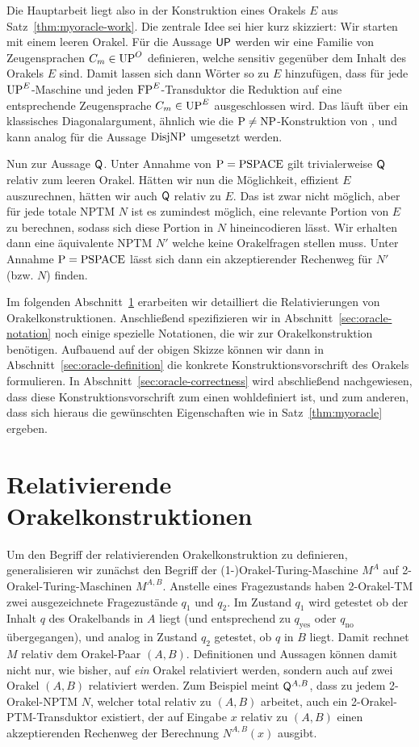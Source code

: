 Die Hauptarbeit liegt also in der Konstruktion eines Orakels $E$ aus Satz~\ref{thm:myoracle-work}.
Die zentrale Idee sei hier kurz skizziert:
Wir starten mit einem leeren Orakel.
Für die Aussage $\mathsf{UP}$ werden wir eine Familie von Zeugensprachen $C_m\in\mathrm{UP}^O$ definieren, welche sensitiv gegenüber dem Inhalt des Orakels $E$ sind.
Damit lassen sich dann Wörter so zu $E$ hinzufügen, dass für jede $\mathrm{UP}^E$-Maschine und jeden $\mathrm{FP}^E$-Transduktor die Reduktion auf eine entsprechende Zeugensprache $C_m\in\mathrm{UP}^E$ ausgeschlossen wird.
Das läuft über ein klassisches Diagonalargument, ähnlich wie die $\mathrm{P}\neq\mathrm{NP}$-Konstruktion von \textcite{baker_relativizations_1975}, und kann analog für die Aussage $\mathrm{DisjNP}$ umgesetzt werden.

Nun zur Aussage $\mathsf{Q}$. Unter Annahme von $\mathrm{P}=\mathrm{PSPACE}$ gilt trivialerweise $\mathsf{Q}$ relativ zum leeren Orakel. 
Hätten wir nun die Möglichkeit, effizient $E$ auszurechnen, hätten wir auch $\mathsf{Q}$ relativ zu $E$.
Das ist zwar nicht möglich, aber für jede totale NPTM $N$ ist es zumindest möglich, eine relevante Portion von $E$ zu berechnen, sodass sich diese Portion in $N$ hineincodieren lässt. Wir erhalten dann eine äquivalente NPTM $N'$ welche keine Orakelfragen stellen muss. Unter Annahme $\mathrm{P}=\mathrm{PSPACE}$ lässt sich dann ein akzeptierender Rechenweg für $N'$ (bzw. $N$) finden.


Im folgenden Abschnitt~\ref{sec:oracle-relativization} erarbeiten wir detailliert die Relativierungen von Orakelkonstruktionen.
Anschließend spezifizieren wir in Abschnitt~\ref{sec:oracle-notation} noch einige spezielle Notationen, die wir zur Orakelkonstruktion benötigen.
Aufbauend auf der obigen Skizze können wir dann in Abschnitt~\ref{sec:oracle-definition} die konkrete Konstruktionsvorschrift des Orakels formulieren.
In Abschnitt~\ref{sec:oracle-correctness} wird abschließend nachgewiesen, dass diese Konstruktionsvorschrift zum einen wohldefiniert ist, und zum anderen, dass sich hieraus die gewünschten Eigenschaften wie in Satz~\ref{thm:myoracle} ergeben.


\section{Relativierende Orakelkonstruktionen}\label{sec:oracle-relativization}

Um den Begriff der relativierenden Orakelkonstruktion zu definieren, generalisieren wir zunächst den Begriff der (1-)Orakel-Turing-Maschine $M^A$ auf 2-Orakel-Turing-Maschinen $M^{A,B}$. Anstelle eines Fragezustands haben 2-Orakel-TM zwei ausgezeichnete Fragezustände $q_1$ und $q_2$. 
Im Zustand $q_1$ wird getestet ob der Inhalt $q$ des Orakelbands in $A$ liegt (und entsprechend zu $q_{\text{yes}}$ oder $q_{\text{no}}$ übergegangen), und analog in Zustand $q_2$ getestet, ob $q$ in $B$ liegt.
Damit rechnet $M$ relativ dem Orakel-Paar $(A,B)$. 
Definitionen und Aussagen können damit nicht nur, wie bisher, auf \emph{ein} Orakel relativiert werden, sondern auch auf zwei Orakel $(A,B)$ relativiert werden.
Zum Beispiel meint $\mathsf{Q}^{A,B}$, dass zu jedem 2-Orakel-NPTM $N$, welcher total relativ zu $(A,B)$ arbeitet, auch ein 2-Orakel-PTM-Transduktor existiert, der auf Eingabe $x$ relativ zu $(A,B)$ einen akzeptierenden Rechenweg der Berechnung $N^{A,B}(x)$ ausgibt.

